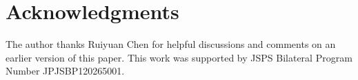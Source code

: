 \documentclass{article}
\theoremstyle{plain}
\begin{document}
\section*{Acknowledgments}

The author thanks Ruiyuan Chen for helpful discussions and comments on an earlier version of this paper. This work was supported by JSPS Bilateral Program Number JPJSBP120265001.






\end{document}
